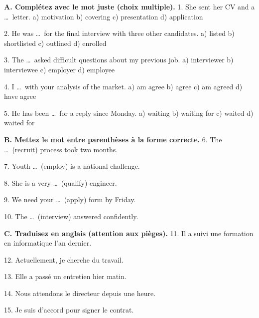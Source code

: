 \documentclass[11pt]{article}
\begin{document}
\begin{exercice}
\textbf{A. Complétez avec le mot juste (choix multiple).}
1. She sent her CV and a \ldots\ letter. \quad a) motivation \quad b) covering \quad c) presentation \quad d) application\par
2. He was \ldots\ for the final interview with three other candidates. \quad a) listed \quad b) shortlisted \quad c) outlined \quad d) enrolled\par
3. The \ldots\ asked difficult questions about my previous job. \quad a) interviewer \quad b) interviewee \quad c) employer \quad d) employee\par
4. I \ldots\ with your analysis of the market. \quad a) am agree \quad b) agree \quad c) am agreed \quad d) have agree\par
5. He has been \ldots\ for a reply since Monday. \quad a) waiting \quad b) waiting for \quad c) waited \quad d) waited for\par
\textbf{B. Mettez le mot entre parenthèses à la forme correcte.}
6. The \ldots\ (recruit) process took two months.\par
7. Youth \ldots\ (employ) is a national challenge.\par
8. She is a very \ldots\ (qualify) engineer.\par
9. We need your \ldots\ (apply) form by Friday.\par
10. The \ldots\ (interview) answered confidently.\par
\textbf{C. Traduisez en anglais (attention aux pièges).}
11. Il a suivi une formation en informatique l'an dernier.\par
12. Actuellement, je cherche du travail.\par
13. Elle a passé un entretien hier matin.\par
14. Nous attendons le directeur depuis une heure.\par
15. Je suis d'accord pour signer le contrat.
\end{exercice}
\end{document}
